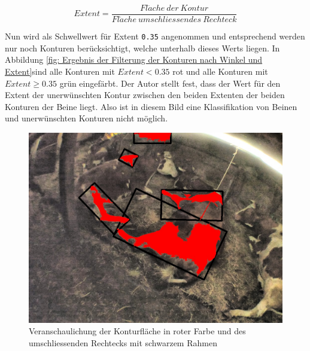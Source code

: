 \begin{equation}\label{Extent}
Extent =  \frac{Fl\ddot{a}che\ der\ Kontur}{Fl\ddot{a}che\  umschliessendes\  Rechteck}  
\end{equation}

Nun wird als Schwellwert für Extent \texttt{0.35} angenommen und entsprechend werden nur noch Konturen berücksichtigt, welche unterhalb dieses Werts liegen. In Abbildung \ref{fig: Ergebnis der Filterung der Konturen nach Winkel und Extent}sind alle Konturen mit ${Extent < 0.35}$ rot und alle Konturen mit $Extent \geq 0.35 $ grün eingefärbt. Der Autor stellt fest, dass der Wert für den Extent der unerwünschten Kontur zwischen den beiden Extenten der beiden Konturen der Beine liegt. Also ist in diesem Bild eine Klassifikation von Beinen und unerwünschten Konturen nicht möglich. 

\begin{figure}[H]
	
	
	\center
	\includegraphics[scale=0.43]{Grafiken/entwicklung/24ExtentDemonstration.jpg}
	\caption{Veranschaulichung der Konturfläche in roter Farbe und des umschliessenden Rechtecks mit schwarzem Rahmen } 
	\label{fig:Veranschaulichung der Konturfläche in roter Farbe und des umschliessenden Rechtecks mit schwarzem Rahmen} 
\end{figure}


